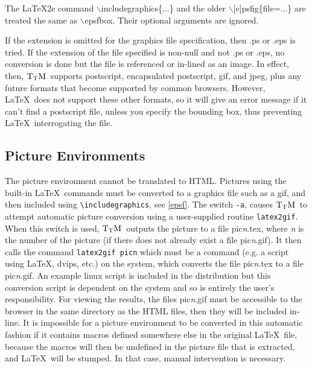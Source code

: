 \documentclass[12pt]{article}
\def\TtM{$\rm{}T_TH$}
\def\TtM{$\rm{}T_TM$}%
\begin{document}
The \LaTeX2e command $\backslash$includegraphics\{...\} and the older
$\backslash$[e]psfig\{file=...\} are treated the same as $\backslash$epsfbox.
Their optional arguments are ignored.

If the extension is omitted for the graphics file specification, then
.ps or .eps is tried.  If the extension of the file specified is
non-null and not .ps or .eps, no conversion is done but the file
is referenced or in-lined as an image. In effect, then, \TtM\ supports
postscript, encapsulated postscript, gif, and jpeg, plus any future
formats that become supported by common browsers. However, \LaTeX\ does
not support these other formats, so it will give an error message if
it can't find a postscript file, unless you specify the bounding box,
thus preventing \LaTeX\ interrogating the file.

\subsection{Picture Environments}
\label{pict}
The picture environment cannot be translated to HTML. Pictures using
the built-in \LaTeX\ commands must be converted to a graphics file such
as a gif, and then included using \verb+\includegraphics+, see
\ref{epsf}. The switch \verb+-a+,
 causes \TtM\ to attempt automatic 
picture conversion using a user-supplied routine \verb+latex2gif+.
When this switch is used, \TtM\ outputs the picture to a file pic\textit{n}.tex,
where \textit n is the number of the picture (if there does not already exist
a file pic\textit{n}.gif). It then calls the command \verb+latex2gif picn+
which must be a command (e.g. a script using \LaTeX, dvips, etc.) on
the system, which converts the file pic\textit{n}.tex to a file pic\textit{n}.gif. An
example linux script is included in the distribution but this
conversion script is dependent on the system and so is entirely the
user's responsibility. For viewing the results, the files pic\textit{n}.gif
must be accessible to the browser in the same directory as the HTML
files, then they will be included in-line. It is impossible for a
picture environment to be converted in this automatic fashion if it
contains macros defined somewhere else in the original \LaTeX\ file,
because the macros will then be undefined in the picture file that is
extracted, and \LaTeX\ will be stumped. In that case, manual
intervention is necessary.
\end{document}
